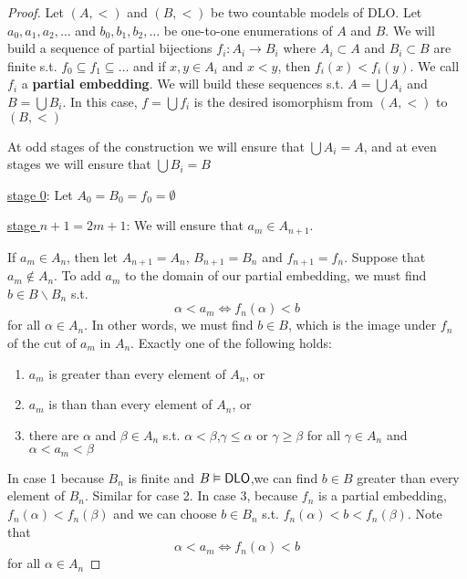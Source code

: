 \documentclass[11pt]{article}
\begin{document}
\begin{proof}
Let \((A,<)\) and \((B,<)\) be two countable models of DLO. Let
\(a_0,a_1,a_2,\dots\) and \(b_0,b_1,b_2,\dots\) be one-to-one enumerations
of \(A\) and \(B\). We will build a sequence of partial bijections
\(f_i:A_i\to B_i\) where \(A_i\subset A\) and \(B_i\subset B\) are finite
s.t. \(f_0\subseteq f_1\subseteq\dots\) and if \(x,y\in A_i\) and \(x<y\),
then \(f_i(x)<f_i(y)\). We call \(f_i\) a \textbf{partial embedding}. We will build
these sequences s.t. \(A=\bigcup A_i\) and \(B=\bigcup B_i\). In this case,
\(f=\bigcup f_i\) is the desired isomorphism from \((A,<)\) to \((B,<)\)

At odd stages of the construction we will ensure that \(\bigcup A_i=A\), and
at even stages we will ensure that \(\bigcup B_i=B\)

\uline{stage 0}: Let \(A_0=B_0=f_0=\emptyset\)

\uline{stage \(n+1=2m+1\)}: We will ensure that \(a_m\in A_{n+1}\).

If \(a_m\in A_n\), then let \(A_{n+1}=A_n\), \(B_{n+1}=B_n\) and
\(f_{n+1}=f_n\). Suppose that \(a_m\not\in A_n\). To add \(a_m\) to the
domain of our partial embedding, we must find \(b\in B\backslash B_n\) s.t.
\begin{equation*}
\alpha<a_m\Leftrightarrow f_n(\alpha)<b
\end{equation*}
for all \(\alpha\in A_n\). In other words, we must find \(b\in B\), which is
the image under \(f_n\) of the cut of \(a_m\) in \(A_n\). Exactly one of the
following holds:
\begin{enumerate}
\item \(a_m\) is greater than every element of \(A_n\), or
\item \(a_m\) is than than every element of \(A_n\), or
\item there are \(\alpha\) and \(\beta\in A_n\) s.t. \(\alpha<\beta\),\(\gamma\le\alpha\) or
\(\gamma\ge\beta\) for all \(\gamma\in A_n\) and \(\alpha<a_m<\beta\)
\end{enumerate}


In case 1 because \(B_n\) is finite and \(B\vDash\operatorname{\textsf{DLO}}\),we can find 
\(b\in B\) greater than every element of \(B_n\). Similar for case 2. In
case 3, because \(f_n\) is a partial embedding, \(f_n(\alpha)<f_n(\beta)\) and we can
choose \(b\in B_n\) s.t. \(f_n(\alpha)<b<f_n(\beta)\). Note that 
\begin{equation*}
\alpha<a_m\Leftrightarrow f_n(\alpha)<b
\end{equation*}
for all \(\alpha\in A_n\)


\end{proof}
\end{document}
